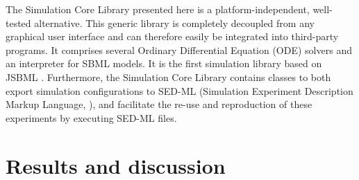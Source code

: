 \documentclass[10pt]{bmc_article}
\newenvironment{bmcformat}{\baselineskip20pt\sloppy\setboolean{publ}{false}}{\baselineskip20pt\sloppy}
\begin{document}
\begin{bmcformat}
%
%
%
%
The Simulation Core Library presented here is a platform-independent,
well-tested alternative.
This generic library is completely decoupled from any graphical user interface
and can therefore easily be integrated into third-party programs.
It comprises several Ordinary Differential Equation (ODE)
solvers and an interpreter for SBML models. It is the first simulation library
based on JSBML \cite{Draeger2011b}. 
%
%
Furthermore, the Simulation Core Library contains classes to both export
simulation configurations to SED-ML (Simulation Experiment Description Markup Language,
\cite{Waltemath2011}), and facilitate the re-use and reproduction of these
experiments by executing SED-ML files.

\section*{Results and discussion}


\end{bmcformat}
\end{document}
